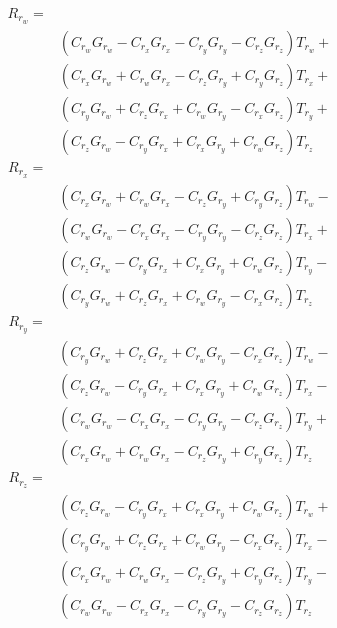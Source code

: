 \documentclass[12pt]{article}
\begin{document}
	\begin{equation}
		\begin{split}
			R_{r_w} = \\&
			(C_{r_w} G_{r_w}-C_{r_x} G_{r_x}-C_{r_y} G_{r_y}-C_{r_z} G_{r_z}) T_{r_w}+\\&(C_{r_x} G_{r_w}+C_{r_w} G_{r_x}-C_{r_z} G_{r_y}+C_{r_y} G_{r_z}) T_{r_x}+\\&(C_{r_y} G_{r_w}+C_{r_z} G_{r_x}+C_{r_w} G_{r_y}-C_{r_x} G_{r_z}) T_{r_y}+\\&(C_{r_z} G_{r_w}-C_{r_y} G_{r_x}+C_{r_x} G_{r_y}+C_{r_w} G_{r_z}) T_{r_z}
		\end{split}
		\label{eq:rrw}
	\end{equation}
	\begin{equation}
		\begin{split}
			R_{r_x} = \\&
			(C_{r_x} G_{r_w}+C_{r_w} G_{r_x}-C_{r_z} G_{r_y}+C_{r_y} G_{r_z}) T_{r_w}-\\&(C_{r_w} G_{r_w}-C_{r_x} G_{r_x}-C_{r_y} G_{r_y}-C_{r_z} G_{r_z}) T_{r_x}+\\&(C_{r_z} G_{r_w}-C_{r_y} G_{r_x}+C_{r_x} G_{r_y}+C_{r_w} G_{r_z}) T_{r_y}-\\&(C_{r_y} G_{r_w}+C_{r_z} G_{r_x}+C_{r_w} G_{r_y}-C_{r_x} G_{r_z}) T_{r_z}
		\end{split}
		\label{eq:rrx}
	\end{equation}
	\begin{equation}
		\begin{split}
			R_{r_y} = \\&
			(C_{r_y} G_{r_w}+C_{r_z} G_{r_x}+C_{r_w} G_{r_y}-C_{r_x} G_{r_z}) T_{r_w}-\\&(C_{r_z} G_{r_w}-C_{r_y} G_{r_x}+C_{r_x} G_{r_y}+C_{r_w} G_{r_z}) T_{r_x}-\\&(C_{r_w} G_{r_w}-C_{r_x} G_{r_x}-C_{r_y} G_{r_y}-C_{r_z} G_{r_z}) T_{r_y}+\\&(C_{r_x} G_{r_w}+C_{r_w} G_{r_x}-C_{r_z} G_{r_y}+C_{r_y} G_{r_z}) T_{r_z}
		\end{split}
		\label{eq:rry}
	\end{equation}
	\begin{equation}
		\begin{split}
			R_{r_z} = \\&
			(C_{r_z} G_{r_w}-C_{r_y} G_{r_x}+C_{r_x} G_{r_y}+C_{r_w} G_{r_z}) T_{r_w}+\\&(C_{r_y} G_{r_w}+C_{r_z} G_{r_x}+C_{r_w} G_{r_y}-C_{r_x} G_{r_z}) T_{r_x}-\\&(C_{r_x} G_{r_w}+C_{r_w} G_{r_x}-C_{r_z} G_{r_y}+C_{r_y} G_{r_z}) T_{r_y}-\\&(C_{r_w} G_{r_w}-C_{r_x} G_{r_x}-C_{r_y} G_{r_y}-C_{r_z} G_{r_z}) T_{r_z}
		\end{split}
		\label{eq:rrz}
	\end{equation}
\end{document}
